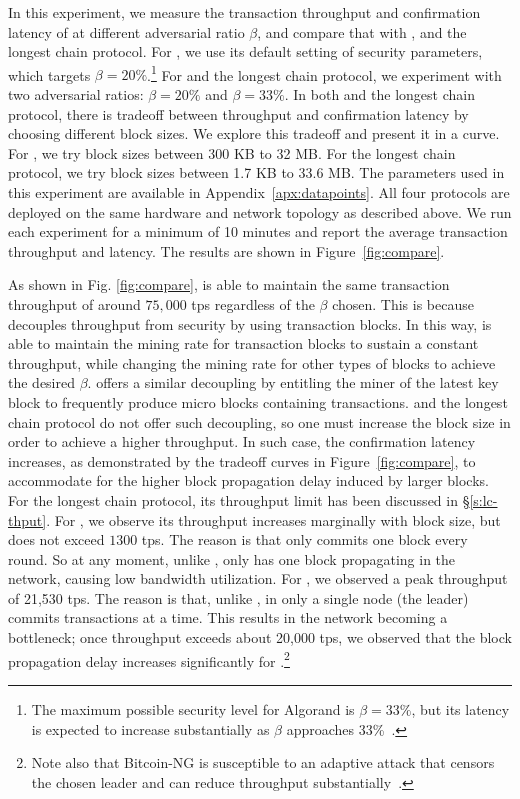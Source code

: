 In this experiment, we measure the transaction throughput and confirmation latency of \prism at different adversarial ratio $\beta$, and compare that with \algorand, \bng and the longest chain protocol. For \algorand, we use its default setting of security parameters, which targets $\beta=20\%$.\footnote{The maximum possible security level for Algorand is $\beta = 33\%$, but its latency is expected to increase substantially as $\beta$ approaches 33\%~\cite{algorand}.} For \bng and the longest chain protocol, we experiment with two adversarial ratios: $\beta=20\%$ and $\beta=33\%$. In both \algorand and the longest chain protocol, there is tradeoff between throughput and confirmation latency by choosing different block sizes. We explore this tradeoff and present it in a curve. For \algorand, we try block sizes between 300 KB to 32 MB. For the longest chain protocol, we try block sizes between 1.7 KB  to  33.6 MB. The parameters used in this experiment are available in Appendix~\ref{apx:datapoints}. All four protocols are deployed on the same hardware and network topology as described above. We run each experiment for a minimum of 10 minutes and report the average transaction throughput and latency. The results are shown in Figure~\ref{fig:compare}.


As shown in Fig. \ref{fig:compare}, \prism is able to maintain the same transaction throughput of around $75,000$ tps regardless of the $\beta$ chosen.
This is because \prism decouples throughput from security by using transaction blocks. In this way, \prism is able to maintain the mining rate for transaction blocks to sustain a constant throughput, while changing the mining rate for other types of blocks to achieve the desired $\beta$. \bng offers a similar decoupling by entitling the miner of the latest key block to frequently produce micro blocks containing transactions. \algorand and the longest chain protocol do not offer such decoupling, so one must increase the block size in order to achieve a higher throughput. In such case, the confirmation latency increases, as demonstrated by the tradeoff curves in Figure~\ref{fig:compare}, to accommodate for the higher block propagation delay induced by larger blocks. For the longest chain protocol, its throughput limit has been discussed in \S\ref{s:lc-thput}.
For \algorand, we observe its throughput increases marginally with block size, but does not exceed $1300$ tps.
The reason is that \algorand only commits one block every round. So at any moment, unlike \prism, \algorand only has one block propagating in the network, causing low bandwidth utilization. For \bng, we observed a peak throughput of 21,530 tps. The reason is that, unlike \prism, in \bng only a single node (the leader) commits transactions at a time. This results in the network becoming a bottleneck; once throughput exceeds about 20,000 tps, we observed that the block propagation delay increases significantly for \bng.\footnote{Note also that Bitcoin-NG is susceptible to an adaptive attack that censors the chosen leader and can reduce throughput substantially~\cite{parallel}.}


